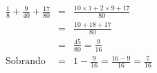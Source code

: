\begin{eqnarray*}
		\frac{1}{8}+\frac{9}{40}+\frac{17}{80}&= & 
		\frac{10\times 1+2\times 9+17}{80}\\
		 &= & \frac{10+18+17}{80}\\
		 &= & \frac{45}{80}= \frac{9}{16}\\
		 \text{Sobrando} 
		 &= & 1-\frac{9}{16}= \frac{16-9}{16}= \frac{7}{16}
\end{eqnarray*}
